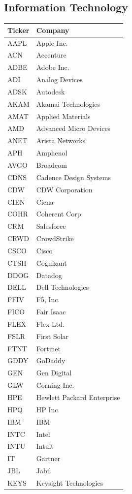 \documentclass[11pt,a4paper]{article}
\begin{document}
\subsection{Information Technology}
{\small
\begin{longtable}{lp{11cm}}
\hline
Ticker & Company \\
\hline
\endhead
AAPL & Apple Inc. \\
ACN & Accenture \\
ADBE & Adobe Inc. \\
ADI & Analog Devices \\
ADSK & Autodesk \\
AKAM & Akamai Technologies \\
AMAT & Applied Materials \\
AMD & Advanced Micro Devices \\
ANET & Arista Networks \\
APH & Amphenol \\
AVGO & Broadcom \\
CDNS & Cadence Design Systems \\
CDW & CDW Corporation \\
CIEN & Ciena \\
COHR & Coherent Corp. \\
CRM & Salesforce \\
CRWD & CrowdStrike \\
CSCO & Cisco \\
CTSH & Cognizant \\
DDOG & Datadog \\
DELL & Dell Technologies \\
FFIV & F5, Inc. \\
FICO & Fair Isaac \\
FLEX & Flex Ltd. \\
FSLR & First Solar \\
FTNT & Fortinet \\
GDDY & GoDaddy \\
GEN & Gen Digital \\
GLW & Corning Inc. \\
HPE & Hewlett Packard Enterprise \\
HPQ & HP Inc. \\
IBM & IBM \\
INTC & Intel \\
INTU & Intuit \\
IT & Gartner \\
JBL & Jabil \\
KEYS & Keysight Technologies \\

\end{longtable}}
\end{document}
